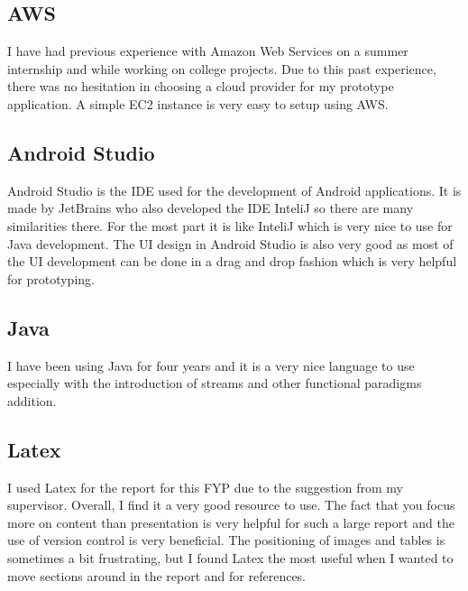 \tocless\subsection{AWS}
I have had previous experience with Amazon Web Services on a summer internship and while working on college projects.
Due to this past experience, there was no hesitation in choosing a cloud provider for my prototype application.
A simple EC2 instance is very easy to setup using AWS.

\tocless\subsection{Android Studio}
Android Studio is the IDE used for the development of Android applications.
It is made by JetBrains who also developed the IDE InteliJ so there are many similarities there.
For the most part it is like InteliJ which is very nice to use for Java development.
The UI design in Android Studio is also very good as most of the UI development can be done in a drag and drop fashion which is very helpful for prototyping.

\tocless\subsection{Java}
I have been using Java for four years and it is a very nice language to use especially with the introduction of streams and other functional paradigms addition.

\tocless\subsection{Latex}
I used Latex for the report for this FYP due to the suggestion from my supervisor.
Overall, I find it a very good resource to use.
The fact that you focus more on content than presentation is very helpful for such a large report and the use of version control is very beneficial.
The positioning of images and tables is sometimes a bit frustrating, but I found Latex the most useful when I wanted to move sections around in the report and for references.
